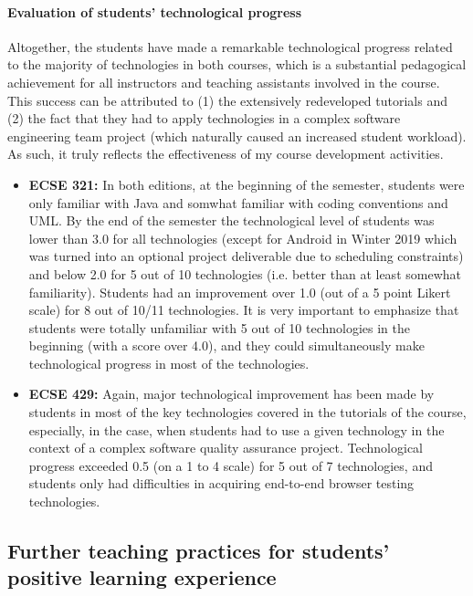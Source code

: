 \documentclass[a4paper,11pt]{report}
\begin{document}
\paragraph{Evaluation of students' technological progress}

Altogether, the students have made a remarkable technological progress related to the majority of technologies in both 
courses, which is a substantial pedagogical achievement for all instructors and teaching assistants involved in the course. 
This success can be attributed to (1) the extensively redeveloped tutorials and (2) the fact that they had to apply 
technologies in a complex software engineering team project (which naturally caused an increased student workload).  As 
such, it truly reflects the effectiveness of my course development activities. 

\begin{itemize}
\item \textbf{ECSE 321:} In both editions, at the beginning of the semester, students were only familiar with Java and 
somwhat familiar with coding conventions and UML. By the end of the semester the technological level of students was 
lower than 3.0 for all technologies (except for Android in Winter 2019 which was turned into an optional project deliverable 
due to scheduling constraints) and below 2.0 for 5 out of 10 technologies (i.e. better than at least somewhat familiarity). 
Students had an improvement over 1.0 (out of a 5 point Likert scale) for 8 out of 10/11 technologies. It is very important to 
emphasize that students were totally unfamiliar with 5 out of 10 technologies in the beginning (with a score over 4.0), and 
they could simultaneously make technological progress in most of the technologies. 

\item \textbf{ECSE 429:} Again, major technological improvement has been made by students in most of the key 
technologies covered in the tutorials of the course, especially, in the case, when students had to use a given technology in 
the context of a complex software quality assurance project. Technological progress exceeded 0.5 (on a 1 to 4 scale) for 5 
out of 7 technologies, and students only had difficulties in acquiring end-to-end browser testing technologies.
\end{itemize}

\subsection{Further teaching practices for students' positive learning experience}
\end{document}
